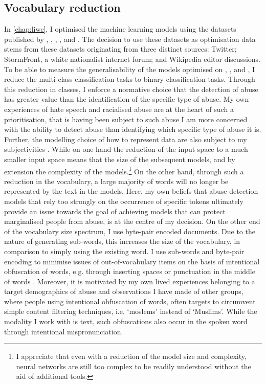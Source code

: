 \subsection{Vocabulary reduction}\label{sub:vocab_redux}
In \autoref{chap:liwc}, I optimised the machine learning models using the datasets published by \citet{Davidson:2017}, \citet{Wulczyn:2016}, \citet{Waseem:2016}, \citet{Waseem-Hovy:2016}, and \citet{Garcia:2018}.
The decision to use these datasets as optimisation data stems from these datasets originating from three distinct sources: Twitter; StormFront, a white nationalist internet forum; and Wikipedia editor discussions.
To be able to measure the generalisability of the models optimised on \citet{Davidson:2017}, \citet{Waseem:2016}, and \citet{Waseem-Hovy:2016}, I reduce the multi-class classification tasks to binary classification tasks.
Through this reduction in classes, I enforce a normative choice that the detection of abuse has greater value than the identification of the specific type of abuse.
My own experiences of hate speech and racialised abuse are at the heart of such a prioritisation, that is having been subject to such abuse I am more concerned with the ability to detect abuse than identifying which specific type of abuse it is.
Further, the modelling choice of how to represent data are also subject to my subjectivities .
While on one hand the reduction of the input space to a much smaller input space means that the size of the subsequent models, and by extension the complexity of the models.\footnote{I appreciate that even with a reduction of the model size and complexity, neural networks are still too complex to be readily understood without the aid of additional tools.}
On the other hand, through such a reduction in the vocabulary, a large majority of words will no longer be represented by the text in the models.
Here, my own beliefs that abuse detection models that rely too strongly on the occurrence of specific tokens ultimately provide an issue towards the goal of achieving models that can protect marginalised people from abuse, is at the centre of my decision.
On the other end of the vocabulary size spectrum, I use byte-pair encoded documents.
Due to the nature of generating sub-words, this increases the size of the vocabulary, in comparison to simply using the existing word.
I use sub-words and byte-pair encoding to minimise issues of out-of-vocabulary items on the basis of intentional obfuscation of words, e.g. through inserting spaces or punctuation in the middle of words \citep{Rottger:2021}.
Moreover, it is motivated by my own lived experiences belonging to a target demographics of abuse and observations I have made of other groups, where people using intentional obfuscation of words, often targets to circumvent simple content filtering techniques, i.e. `moslems' instead of `Muslims'.
While the modality I work with is text, such obfuscations also occur in the spoken word through intentional mispronunciation.


